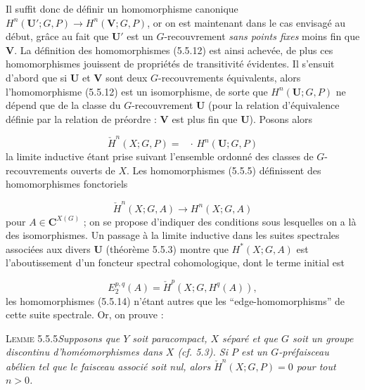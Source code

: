 \clearpage
{}

\noindent Il suffit donc de définir un homomorphisme canonique
$H^n({\mathbf U}';G,P)\to H^n({\mathbf V};G,P)$, or on est maintenant dans le
cas envisagé au début, grâce au fait que ${\mathbf U}'$ est un
$G$-recouvrement \emph{sans points fixes} moins fin que ${\mathbf V}$. La définition
des homomorphismes (5.5.12) est ainsi achevée, de plus ces homomorphismes
jouissent de propriétés de transitivité évidentes. Il s'ensuit d'abord que si
${\mathbf U}$ et ${\mathbf V}$ sont deux $G$-recouvrements équivalents, alors
l'homomorphisme (5.5.12) est un isomorphisme, de sorte que
$H^n({\mathbf U};G,P)$ ne dépend que de la classe du $G$-recouvrement
${\mathbf U}$ (pour la relation d'équivalence définie par la relation de
préordre : ${\mathbf V}$ est plus fin que ${\mathbf U}$). Posons alors

\[
\tag{5.5.13}
\check H^n(X;G,P)=\mathop{\underset{\to}{\lim}}\,\cdot\,H^n({\mathbf U};G,P)
\]
la limite inductive étant prise suivant l'ensemble ordonné des
classes de $G$-recouvrements ouverts de $X$. Les homomorphismes (5.5.5)
définissent des homomorphismes fonctoriels

\[
\tag{5.5.14}
\check H^n(X;G,A)\to H^n(X;G,A)
\]
pour $A\in {\mathbf C}^{X(G)}$ ; on se propose d'indiquer des conditions sous
lesquelles on a là des isomorphismes. Un passage à la limite inductive dans
les suites spectrales associées aux divers ${\mathbf U}$ (théorème 5.5.3)
montre que $H^*(X;G,A)$ est l'aboutissement d'un foncteur spectral
cohomologique, dont le terme initial est

\[
\tag{5.5.15}
E_2^{p,q}(A)=\check H^p(X;G,H^q(A)),
\]
les homomorphismes (5.5.14) n'étant autres que les
``edge-homomorphisms'' de cette suite spectrale. Or, on prouve :

\textsc{Lemme 5.5.5}\quad \textit{Supposons que $Y$ soit
paracompact, $X$ séparé et que $G$ soit un groupe discontinu
d'homéomorphismes dans $X$ \textup{(}\textit{cf.}\textup{ 5.3)}. Si $P$ est un $G$-préfaisceau abélien
tel que le faisceau associé soit nul, alors $\check H^n(X;G,P)=0$ pour tout
$n>0$.}


